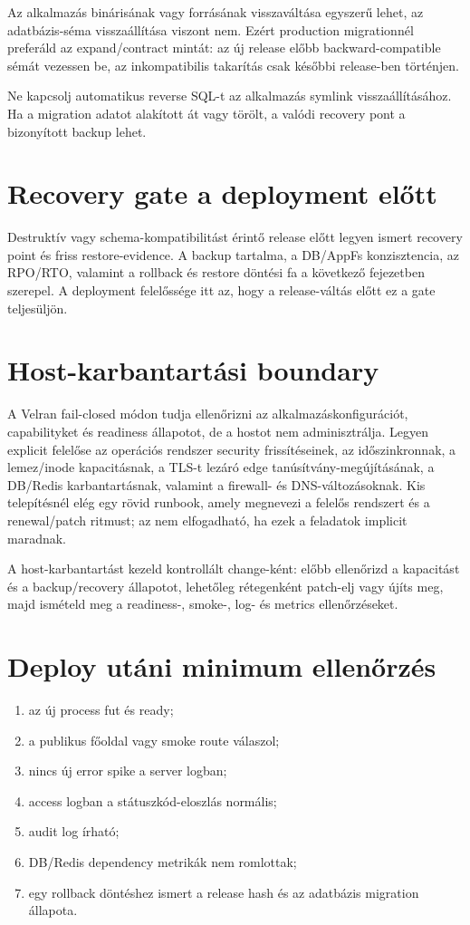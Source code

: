 Az alkalmazás binárisának vagy forrásának visszaváltása egyszerű lehet, az adatbázis-séma visszaállítása viszont nem. Ezért production migrationnél preferáld az expand/contract mintát: az új release előbb backward-compatible sémát vezessen be, az inkompatibilis takarítás csak későbbi release-ben történjen.

Ne kapcsolj automatikus reverse SQL-t az alkalmazás symlink visszaállításához. Ha a migration adatot alakított át vagy törölt, a valódi recovery pont a bizonyított backup lehet.

\section{Recovery gate a deployment előtt}

Destruktív vagy schema-kompatibilitást érintő release előtt legyen ismert recovery point és friss restore-evidence. A backup tartalma, a DB/AppFs konzisztencia, az RPO/RTO, valamint a rollback és restore döntési fa a következő fejezetben szerepel. A deployment felelőssége itt az, hogy a release-váltás előtt ez a gate teljesüljön.

\section{Host-karbantartási boundary}

A Velran fail-closed módon tudja ellenőrizni az alkalmazáskonfigurációt, capabilityket és readiness állapotot, de a hostot nem adminisztrálja. Legyen explicit felelőse az operációs rendszer security frissítéseinek, az időszinkronnak, a lemez/inode kapacitásnak, a TLS-t lezáró edge tanúsítvány-megújításának, a DB/Redis karbantartásnak, valamint a firewall- és DNS-változásoknak. Kis telepítésnél elég egy rövid runbook, amely megnevezi a felelős rendszert és a renewal/patch ritmust; az nem elfogadható, ha ezek a feladatok implicit maradnak.

A host-karbantartást kezeld kontrollált change-ként: előbb ellenőrizd a kapacitást és a backup/recovery állapotot, lehetőleg rétegenként patch-elj vagy újíts meg, majd ismételd meg a readiness-, smoke-, log- és metrics ellenőrzéseket.

\section{Deploy utáni minimum ellenőrzés}

\begin{enumerate}
  \item az új process fut és ready;
  \item a publikus főoldal vagy smoke route válaszol;
  \item nincs új error spike a server logban;
  \item access logban a státuszkód-eloszlás normális;
  \item audit log írható;
  \item DB/Redis dependency metrikák nem romlottak;
  \item egy rollback döntéshez ismert a release hash és az adatbázis migration állapota.
\end{enumerate}


